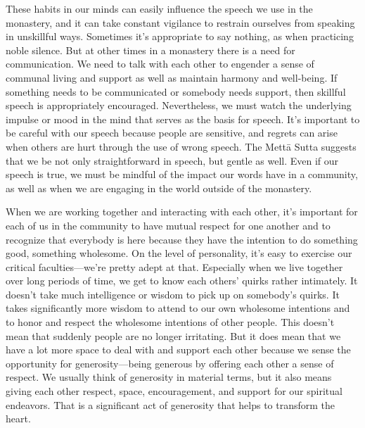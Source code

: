 These habits in our minds can easily influence the speech we use in the
monastery, and it can take constant vigilance to restrain ourselves from
speaking in unskillful ways. \mbox{Sometimes} it's appropriate to say
nothing, as when practicing noble silence. But at other times in a
monastery there is a need for communication. We need to talk with each
other to engender a sense of communal living and support as well as
maintain harmony and well-being. If something needs to be communicated
or somebody needs support, then skillful speech is appropriately
encouraged. Nevertheless, we must watch the underlying impulse or mood
in the mind that serves as the basis for speech. It's important to be
careful with our speech because people are sensitive, and regrets can
arise when others are hurt through the use of wrong speech. The Mettā
Sutta suggests that we be not only straightforward in speech, but gentle
as well. Even if our speech is true, we must be mindful of the impact
our words have in a community, as well as when we are engaging in the
world outside of the monastery.


When we are working together and interacting with each other, it's 
important for each of us in the community to have mutual respect for 
one another and to recognize that everybody is here because they have 
the intention to do something good, something wholesome. On the level 
of personality, it's easy to exercise our critical faculties---we're 
pretty adept at that. Especially when we live together over long 
periods of time, we get to know each others' quirks rather intimately. 
It doesn't take much intelligence or wisdom to pick up on somebody's 
quirks. It takes significantly more wisdom to attend to our own 
wholesome intentions and to honor and respect the wholesome intentions 
of other people. This doesn't mean that suddenly people are no longer 
irritating. But it does mean that we have a lot more space to deal with 
and support each other because we sense the opportunity for 
generosity---being generous by offering each other a sense of respect. 
We usually think of generosity in material terms, but it also means 
giving each other respect, space, encouragement, and support for our 
spiritual endeavors. That is a significant act of generosity that helps 
to transform the heart.


